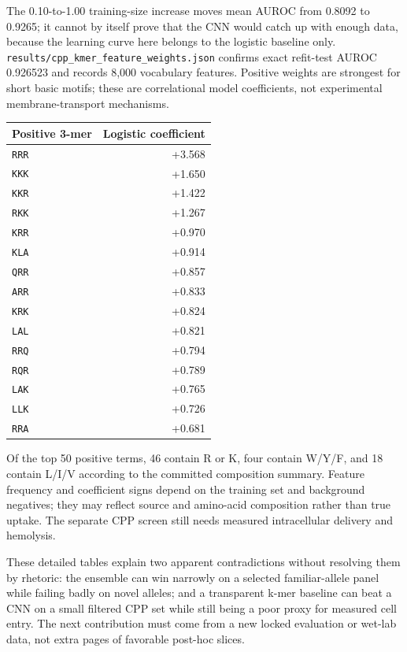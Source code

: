 The 0.10-to-1.00 training-size increase moves mean AUROC from 0.8092 to 0.9265; it cannot by itself prove that the CNN would catch up with enough data, because the learning curve here belongs to the logistic baseline only. \texttt{results/cpp\_kmer\_feature\_weights.json} confirms exact refit-test AUROC 0.926523 and records 8,000 vocabulary features. Positive weights are strongest for short basic motifs; these are correlational model coefficients, not experimental membrane-transport mechanisms.

\begin{longtable}[]{@{}lr@{}}
\toprule
Positive 3-mer & Logistic coefficient\tabularnewline
\midrule
\endhead
\texttt{RRR} & +3.568\tabularnewline
\texttt{KKK} & +1.650\tabularnewline
\texttt{KKR} & +1.422\tabularnewline
\texttt{RKK} & +1.267\tabularnewline
\texttt{KRR} & +0.970\tabularnewline
\texttt{KLA} & +0.914\tabularnewline
\texttt{QRR} & +0.857\tabularnewline
\texttt{ARR} & +0.833\tabularnewline
\texttt{KRK} & +0.824\tabularnewline
\texttt{LAL} & +0.821\tabularnewline
\texttt{RRQ} & +0.794\tabularnewline
\texttt{RQR} & +0.789\tabularnewline
\texttt{LAK} & +0.765\tabularnewline
\texttt{LLK} & +0.726\tabularnewline
\texttt{RRA} & +0.681\tabularnewline
\bottomrule
\end{longtable}

Of the top 50 positive terms, 46 contain R or K, four contain W/Y/F, and 18 contain L/I/V according to the committed composition summary. Feature frequency and coefficient signs depend on the training set and background negatives; they may reflect source and amino-acid composition rather than true uptake. The separate CPP screen still needs measured intracellular delivery and hemolysis.


These detailed tables explain two apparent contradictions without resolving them by rhetoric: the ensemble can win narrowly on a selected familiar-allele panel while failing badly on novel alleles; and a transparent k-mer baseline can beat a CNN on a small filtered CPP set while still being a poor proxy for measured cell entry. The next contribution must come from a new locked evaluation or wet-lab data, not extra pages of favorable post-hoc slices.
